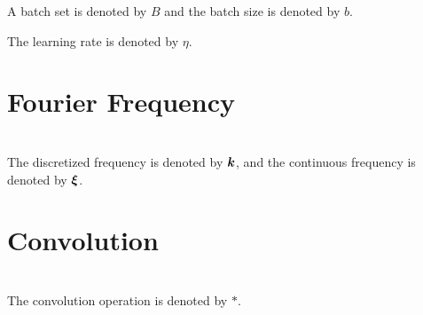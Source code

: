 \documentclass[]{article}
\begin{document}
A batch set is denoted by $B$ and the batch size is denoted by $b$.

The learning rate is denoted by $\eta$.


\section{Fourier Frequency}~\\
The discretized frequency is denoted by $\bm{k}$, and the continuous frequency is denoted by $\bm{\xi}$.

\section{Convolution}~\\
The convolution operation is denoted by $*$.

\newpage
\end{document}
